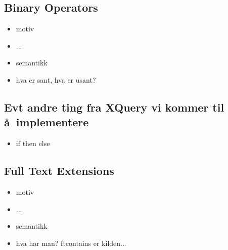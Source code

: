 \subsection{Binary Operators}

\begin{itemize}
\item motiv
\item ...
\item semantikk
\item hva er sant, hva er usant?
\end{itemize}



\subsection{Evt andre ting fra XQuery vi kommer til \aa~implementere}

\begin{itemize}
\item if then else

\end{itemize}

\subsection{Full Text Extensions}

\begin{itemize}
\item motiv
\item ...
\item semantikk
\item hva har man? ftcontains er kilden...
\end{itemize}